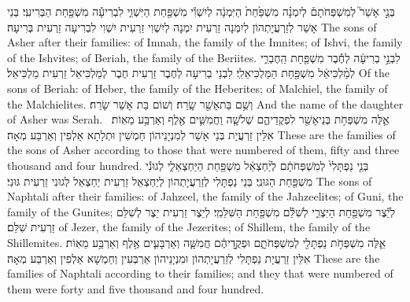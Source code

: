 {בְּנֵ֣י אָשֵׁר֮ לְמִשְׁפְּחֹתָם֒ לְיִמְנָ֗ה מִשְׁפַּ֙חַת֙ הַיִּמְנָ֔ה לְיִשְׁוִ֕י מִשְׁפַּ֖חַת הַיִּשְׁוִ֑י לִבְרִיעָ֕ה מִשְׁפַּ֖חַת הַבְּרִיעִֽי׃}
{בְּנֵי אָשֵׁר לְזַרְעֲיָתְהוֹן לְיִמְנָה זַרְעִית יִמְנָה לְיִשְׁוִי זַרְעִית יִשְׁוִי לִבְרִיעָה זַרְעִית בְּרִיעָה׃}
{The sons of Asher after their families: of Imnah, the family of the Imnites; of Ishvi, the family of the Ishvites; of Beriah, the family of the Beriites.}{}
{לִבְנֵ֣י בְרִיעָ֔ה לְחֶ֕בֶר מִשְׁפַּ֖חַת הַֽחֶבְרִ֑י לְמַ֨לְכִּיאֵ֔ל מִשְׁפַּ֖חַת הַמַּלְכִּיאֵלִֽי׃}
{לִבְנֵי בְרִיעָה לְחֶבֶר זַרְעִית חֶבֶר לְמַלְכִּיאֵל זַרְעִית מַלְכִּיאֵל׃}
{Of the sons of Beriah: of Heber, the family of the Heberites; of Malchiel, the family of the Malchielites.}{}
{וְשֵׁ֥ם בַּת\maqqaf אָשֵׁ֖ר שָֽׂרַח׃}
{וְשׁוֹם בַּת אָשֵׁר שָׂרַח׃}
{And the name of the daughter of Asher was Serah.}{}
{אֵ֛לֶּה מִשְׁפְּחֹ֥ת בְּנֵי\maqqaf אָשֵׁ֖ר לִפְקֻדֵיהֶ֑ם שְׁלֹשָׁ֧ה וַחֲמִשִּׁ֛ים אֶ֖לֶף וְאַרְבַּ֥ע מֵאֽוֹת׃ \setuma }
{אִלֵּין זַרְעֲיָת בְּנֵי אָשֵׁר לְמִנְיָנֵיהוֹן חַמְשִׁין וּתְלָתָא אַלְפִין וְאַרְבַּע מְאָה׃}
{These are the families of the sons of Asher according to those that were numbered of them, fifty and three thousand and four hundred.}{}
{בְּנֵ֤י נַפְתָּלִי֙ לְמִשְׁפְּחֹתָ֔ם לְיַ֨חְצְאֵ֔ל מִשְׁפַּ֖חַת הַיַּחְצְאֵלִ֑י לְגוּנִ֕י מִשְׁפַּ֖חַת הַגּוּנִֽי׃}
{בְּנֵי נַפְתָּלִי לְזַרְעֲיָתְהוֹן לְיַחְצְאֵל זַרְעִית יַחְצְאֵל לְגוּנִי זַרְעִית גּוּנִי׃}
{The sons of Naphtali after their families: of Jahzeel, the family of the Jahzeelites; of Guni, the family of the Gunites;}{}
{לְיֵ֕צֶר מִשְׁפַּ֖חַת הַיִּצְרִ֑י לְשִׁלֵּ֕ם מִשְׁפַּ֖חַת הַשִּׁלֵּמִֽי׃}
{לְיֵצֶר זַרְעִית יֵצֶר לְשִׁלֵּם זַרְעִית שִׁלֵּם׃}
{of Jezer, the family of the Jezerites; of Shillem, the family of the Shillemites.}{}
{אֵ֛לֶּה מִשְׁפְּחֹ֥ת נַפְתָּלִ֖י לְמִשְׁפְּחֹתָ֑ם וּפְקֻ֣דֵיהֶ֔ם חֲמִשָּׁ֧ה וְאַרְבָּעִ֛ים אֶ֖לֶף וְאַרְבַּ֥ע מֵאֽוֹת׃}
{אִלֵּין זַרְעֲיָת נַפְתָּלִי לְזַרְעֲיָתְהוֹן וּמִנְיָנֵיהוֹן אַרְבְּעִין וְחַמְשָׁא אַלְפִין וְאַרְבַּע מְאָה׃}
{These are the families of Naphtali according to their families; and they that were numbered of them were forty and five thousand and four hundred.}{}
